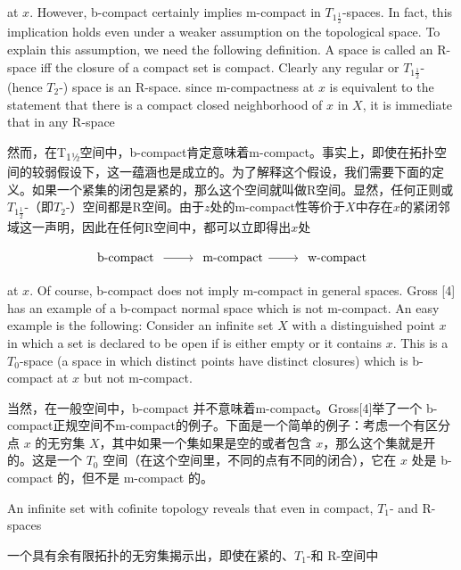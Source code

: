 \documentclass[options]{article}
\begin{document}
\begin{paracol}{2}
	\begin{en}
		\noindent at $x$. However, b-compact certainly implies m-compact in $T_{1
				\frac{1}{2}}$-spaces. In fact, this implication holds even under a weaker assumption on
		the topological space. To explain this assumption, we need the following definition. A
		space is called an R-space iff the closure of a compact set is compact. Clearly any
		regular or $T_{1 \frac{1}{2}}$-(hence $T_{2}$-) space is an R-space. since
		m-compactness at $x$ is equivalent to the statement that there is a compact
		closed neighborhood of $x$ in $X$, it is immediate that in any R-space
	\end{en}
	\begin{cn}
		\noindent 然而，在T\textsubscript{\!$1$½}空间中，b-compact肯定意味着m-compact。事实上，即使在拓扑空间的较弱假设下，这一蕴涵也是成立的。为了解释这个假设，我们需要下面的定义。如果一个紧集的闭包是紧的，那么这个空间就叫做R空间。显然，任何正则或$T_{1\frac{1}{2}}$-（即$T_{2}$-）空间都是R空间。由于$z$处的m-compact性等价于$X$中存在$x$的紧闭邻域这一声明，因此在任何R空间中，都可以立即得出$x$处
	\end{cn}
\end{paracol}
\[
		\begin{tikzcd}
			\text{ b-compact }\ar[r]&\text { m-compact}\ar[r]& \text { w-compact }
		\end{tikzcd}
\]
\begin{paracol}{2}
	\begin{en}
		at $x$. Of course, b-compact does not imply m-compact in general spaces.
		Gross [4] has an example of a b-compact normal space which is not m-compact.
		An easy example is the following: Consider an infinite set $X$ with a
		distinguished point $x$ in which a set is declared to be open if is either
		empty or it contains $x$. This is a $T_0$-space (a space in which
		distinct points have distinct closures) which is b-compact at $x$ but not
		m-compact.
	\end{en}
	\begin{cn}
		当然，在一般空间中，b-compact 并不意味着m-compact。Gross[4]举了一个 b-compact正规空间不m-compact的例子。下面是一个简单的例子：考虑一个有区分点 $x$ 的无穷集 $X$，其中如果一个集如果是空的或者包含 $x$，那么这个集就是开的。这是一个 $T_0$ 空间（在这个空间里，不同的点有不同的闭合），它在 $x$ 处是 b-compact 的，但不是 m-compact 的。
	\end{cn}
	\begin{en}
		An infinite set with cofinite topology reveals that even in compact, $T_1$- and R-spaces
		
	\end{en}
	\begin{cn}
		一个具有余有限拓扑的无穷集揭示出，即使在紧的、$T_1$-和 R-空间中
	\end{cn}
\end{paracol}
\end{document}
